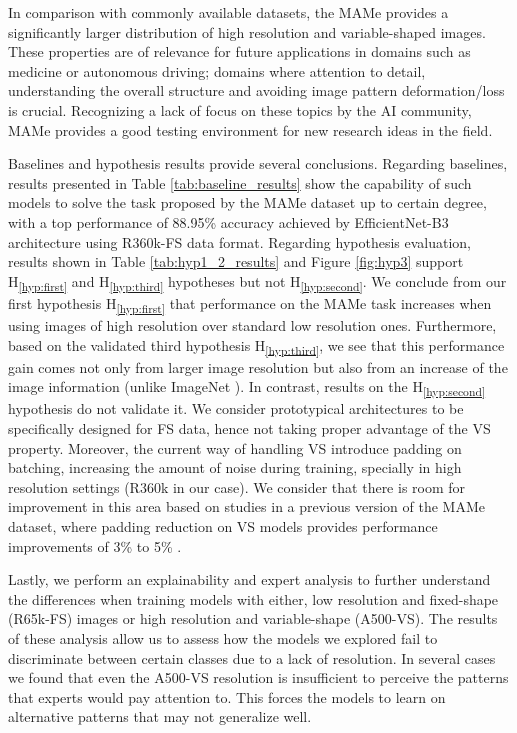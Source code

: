 \documentclass{article}
\newcommand{\hypref}[1]{\textup{H\textsubscript{\ref{#1}}}}
\begin{document}
In comparison with commonly available datasets, the MAMe provides a significantly larger distribution of high resolution and variable-shaped images. These properties are of relevance for future applications in domains such as medicine or autonomous driving; domains where attention to detail, understanding the overall structure and avoiding image pattern deformation/loss is crucial. Recognizing a lack of focus on these topics by the AI community, MAMe provides a good testing environment for new research ideas in the field.


Baselines and hypothesis results provide several conclusions. Regarding baselines, results presented in Table \ref{tab:baseline_results} show the capability of such models to solve the task proposed by the MAMe dataset up to certain degree, with a top performance of 88.95\% accuracy achieved by EfficientNet-B3 architecture using R360k-FS data format. Regarding hypothesis evaluation, results shown in Table \ref{tab:hyp1_2_results} and Figure \ref{fig:hyp3} support \hypref{hyp:first} and \hypref{hyp:third} hypotheses but not \hypref{hyp:second}. We conclude from our first hypothesis \hypref{hyp:first} that performance on the MAMe task increases when using images of high resolution over standard low resolution ones. Furthermore, based on the validated third hypothesis \hypref{hyp:third}, we see that this performance gain comes not only from larger image resolution but also from an increase of the image information (unlike ImageNet \citep{russakovsky2015imagenet}). In contrast, results on the \hypref{hyp:second} hypothesis do not validate it. We consider prototypical architectures to be specifically designed for FS data, hence not taking proper advantage of the VS property. Moreover, the current way of handling VS introduce padding on batching, increasing the amount of noise during training, specially in high resolution settings (\ie R360k in our case). We consider that there is room for improvement in this area based on studies in a previous version of the MAMe dataset, where padding reduction on VS models provides performance improvements of 3\% to 5\%  \citep{sotiropoulos2020handling}.

Lastly, we perform an explainability and expert analysis to further understand the differences when training models with either, low resolution and fixed-shape (R65k-FS) images or high resolution and variable-shape (A500-VS). The results of these analysis allow us to assess how the models we explored fail to discriminate between certain classes due to a lack of resolution. In several cases we found that even the A500-VS resolution is insufficient to perceive the patterns that experts would pay attention to. This forces the models to learn on alternative patterns that may not generalize well.
\end{document}
